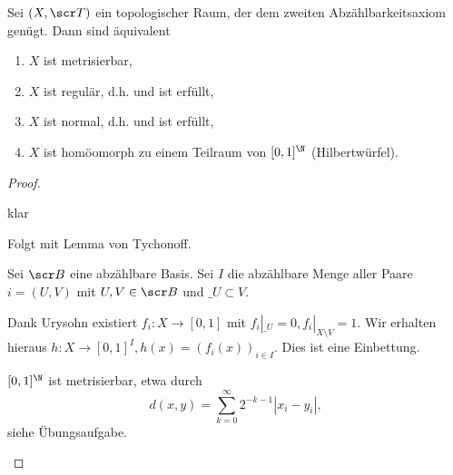 \begin{st}
	Sei $(X, \scr T)$ ein topologischer Raum, der dem zweiten Abzählbarkeitsaxiom genügt.
	Dann sind äquivalent
	\begin{enumerate}[1)]
		\item
			$X$ ist metrisierbar,
		\item
			$X$ ist regulär, d.h.  und  ist erfüllt,
		\item
			$X$ ist normal, d.h.  und  ist erfüllt,
		\item
			$X$ ist homöomorph zu einem Teilraum von $[0,1]^\N$ (Hilbertwürfel).
	\end{enumerate}
	\begin{proof}
		\begin{segnb}[„(1)$\implies$(2)“]
			klar
		\end{segnb}
		\begin{segnb}[„(2)$\implies$(3)“]
			Folgt mit Lemma von Tychonoff. %
		\end{segnb}
		\begin{segnb}[„(3)$\implies$(4)“]
			Sei $\scr B$ eine abzählbare Basis.
			Sei $I$ die abzählbare Menge aller Paare $i = (U,V)$ mit $U,V \in \scr B$ und $\_U \subset V$.

			Dank Urysohn existiert $f_i: X \to [0,1]$ mit $f_i|_{\_U} = 0, f_i|_{X \setminus V} = 1$.
			Wir erhalten hieraus $h: X \to [0,1]^I, h(x) = (f_i(x))_{i \in I}$.
			Dies ist eine Einbettung.
		\end{segnb}
		\begin{segnb}[„(4)$\implies$(1)“]
			$[0,1]^\N$ ist metrisierbar, etwa durch
			\[
				d(x,y) = \sum_{k=0}^\infty 2^{-k-1} |x_i - y_i|,
			\]
			siehe Übungsaufgabe. %
		\end{segnb}
	\end{proof}
\end{st}
